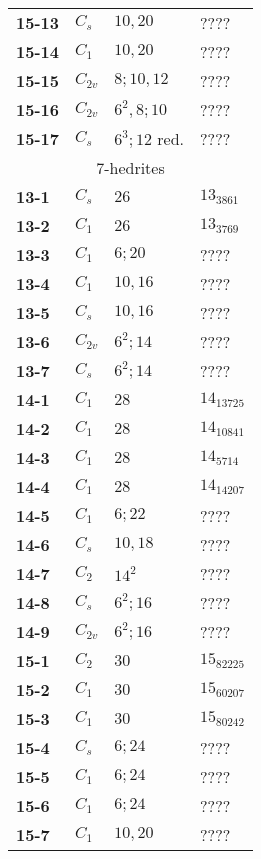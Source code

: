 \documentclass[12pt]{article}
\begin{document}
\begin{table}
\begin{center}
{\begin{minipage}[t]{7cm}
\begin{tabular}{||l|l|l|l||}
{\bf 15-13}     &$C_s$  &$10, 20$       &????\\
{\bf 15-14}     &$C_1$  &$10,20$        &????\\
{\bf 15-15}     &$C_{2v}$       &$8;10,12$      &????\\
{\bf 15-16}     &$C_{2v}$       &$6^2,8;10$     &????\\
{\bf 15-17}     &$C_s$  &$6^3; 12$ red. &????\\\hline\hline
\multicolumn{4}{||c||}{$7$-hedrites}\\\hline
{\bf 13-1}      &$C_s$  &$26$           &$13_{3861}$\\
{\bf 13-2}      &$C_1$  &$26$           &$13_{3769}$\\
{\bf 13-3}      &$C_1$  &$6; 20$                &????\\
{\bf 13-4}      &$C_1$  &$10, 16$               &????\\
{\bf 13-5}      &$C_s$  &$10, 16$               &????\\
{\bf 13-6}      &$C_{2v}$       &$6^2; 14$      &????\\
{\bf 13-7}      &$C_{s}$        &$6^2; 14$      &????\\\hline
{\bf 14-1}      &$C_1$  &$28$           &$14_{13725}$\\
{\bf 14-2}      &$C_1$  &$28$           &$14_{10841}$\\
{\bf 14-3}      &$C_1$  &$28$           &$14_{5714}$\\
{\bf 14-4}      &$C_1$  &$28$           &$14_{14207}$\\
{\bf 14-5}      &$C_1$  &$6; 22$                &????\\
{\bf 14-6}      &$C_s$  &$10, 18$               &????\\
{\bf 14-7}      &$C_2$  &$14^2$         &????\\
{\bf 14-8}      &$C_s$  &$6^2; 16$      &????\\
{\bf 14-9}      &$C_{2v}$       &$6^2; 16$      &????\\\hline
{\bf 15-1}      &$C_2$  &$30$   &$15_{82225}$\\
{\bf 15-2}      &$C_1$  &$30$   &$15_{60207}$\\
{\bf 15-3}      &$C_1$  &$30$   &$15_{80242}$\\
{\bf 15-4}      &$C_s$  &$6;24$ &????\\
{\bf 15-5}      &$C_1$  &$6;24$ &????\\
{\bf 15-6}      &$C_1$  &$6;24$ &????\\
{\bf 15-7}      &$C_1$  &$10,20$        &????\\

\end{tabular}
\end{minipage}}
\end{center}
\end{table}
\end{document}
